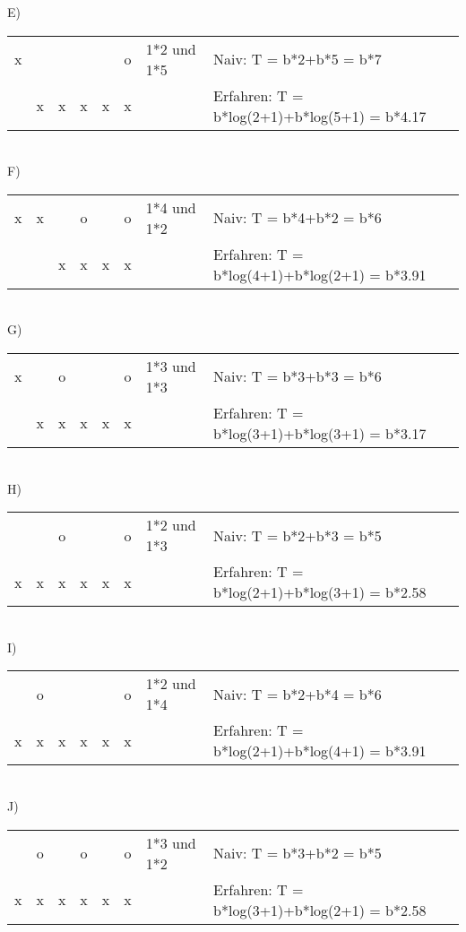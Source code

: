 \documentclass[a4paper,10pt]{article}
\begin{document}
E)\\
\begin{tabular}{|c|c|c|c|c|c|l|l}
\cline{1-6} x &   &   &   &   & o & 1*2 und 1*5 & Naiv: T = b*2+b*5 = b*7 \\
\cline{1-6}   & x & x & x & x & x &   & Erfahren: T = b*log(2+1)+b*log(5+1) = b*4.17 \\
\cline{1-6}
\end{tabular} \\

F)\\
\begin{tabular}{|c|c|c|c|c|c|l|l}
\cline{1-6} x & x &   & o &   & o & 1*4 und 1*2 & Naiv: T = b*4+b*2 = b*6 \\
\cline{1-6}   &   & x & x & x & x &   & Erfahren: T = b*log(4+1)+b*log(2+1) = b*3.91 \\
\cline{1-6}
\end{tabular} \\

G)\\
\begin{tabular}{|c|c|c|c|c|c|l|l}
\cline{1-6} x &   & o &   &   & o & 1*3 und 1*3 & Naiv: T = b*3+b*3 = b*6 \\
\cline{1-6}   & x & x & x & x & x &   & Erfahren: T = b*log(3+1)+b*log(3+1) = b*3.17 \\
\cline{1-6}
\end{tabular} \\

H)\\
\begin{tabular}{|c|c|c|c|c|c|l|l}
\cline{1-6}   &   & o &   &   & o & 1*2 und 1*3 & Naiv: T = b*2+b*3 = b*5 \\
\cline{1-6} x & x & x & x & x & x &   & Erfahren: T = b*log(2+1)+b*log(3+1) = b*2.58 \\
\cline{1-6}
\end{tabular} \\

I)\\
\begin{tabular}{|c|c|c|c|c|c|l|l}
\cline{1-6}   & o &   &   &   & o & 1*2 und 1*4 & Naiv: T = b*2+b*4 = b*6 \\
\cline{1-6} x & x & x & x & x & x &   & Erfahren: T = b*log(2+1)+b*log(4+1) = b*3.91 \\
\cline{1-6}
\end{tabular} \\

J)\\
\begin{tabular}{|c|c|c|c|c|c|l|l}
\cline{1-6}   & o &   & o &   & o & 1*3 und 1*2 & Naiv: T = b*3+b*2 = b*5 \\
\cline{1-6} x & x & x & x & x & x &   & Erfahren: T = b*log(3+1)+b*log(2+1) = b*2.58 \\
\cline{1-6}
\end{tabular} \\
\end{document}
